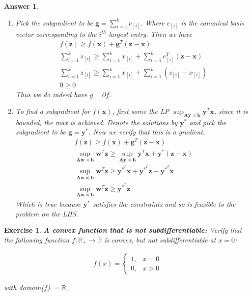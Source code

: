 \documentclass[12pt]{article}
\theoremstyle{colon}
\newtheorem{exercise}{Exercise}
\newtheorem*{answer}{Answer}
\begin{document}
\begin{answer}
\begin{enumerate}[label=\alph*)]
    \item Pick the subgradient to be $\bm{g} = \sum_{i=1}^k e_{[i]}$. Where $e_{[i]}$ is the canonical basis vector corresponding to the $i^{th}$ largest entry. Then we have
      \begin{gather*}
          f(\bm{z}) \geq f(\bm{x}) + \bm{g}^T (\bm{z} - \bm{x}) \\
          \sum_{i=1}^k z_{[i]} \geq \sum_{i=1}^k x_{[i]} + \sum_{i=1}^k e_{[i]}^T (\bm{z} - \bm{x}) \\
          \sum_{i=1}^k z_{[i]} \geq \sum_{i=1}^k x_{[i]} + \sum_{i=1}^k(z_{[i]} - x_{[i]}) \\
          0 \geq 0
      \end{gather*}
      Thus we do indeed have $g = \partial f$.

    \item To find a subgradient for $f(\bm{x})$, first some the LP $\sup_{\bm{A} \bm{y} \preceq \bm{b}} \bm{y}^T \bm{x}$, since it is bounded, the max is achieved. Denote the solutions by $\bm{y}^*$ and pick the subgradient to be $\bm{g} = \bm{y}^*$. Now we verify that this is a gradient.
      \begin{gather*}
          f(\bm{z}) \geq f(\bm{x}) + \bm{g}^T (\bm{z} - \bm{x}) \\
          \sup_{\bm{A} \bm{w} \preceq \bm{b}} \bm{w}^T \bm{z} \geq \sup_{\bm{A} \bm{y} \preceq \bm{b}} \bm{y}^T \bm{x} + \bm{y}^* (\bm{z} - \bm{x}) \\
          \sup_{\bm{A} \bm{w} \preceq \bm{b}} \bm{w}^T \bm{z} \geq \bm{y}^{*^T} \bm{x} + \bm{y}^{*^T} \bm{z} - \bm{y}^{*^T} \bm{x} \\
          \sup_{\bm{A} \bm{w} \preceq \bm{b}} \bm{w}^T \bm{z} \geq \bm{y}^{*^T} \bm{z} 
      \end{gather*}
      Which is true because $\bm{y}^*$ satisfies the constraints and so is feasible to the problem on the LHS.
  \end{enumerate}

\end{answer}

\clearpage

\begin{exercise}
  \textbf{A convex function that is not subdifferentiable:} Verify that the following function $f: \mathbb{R}_+ \rightarrow \mathbb{R}$ is convex, but not subdifferentiable at $x = 0$:

  \begin{gather*}
    f(x) = \begin{cases} 
        1, & x = 0 \\
        0, & x > 0
    \end{cases}
  \end{gather*}

  with domain($f$) $= \mathbb{R}_+$

\end{exercise}
\end{document}
